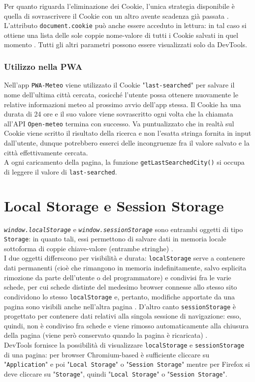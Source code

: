\documentclass[a4paper, 12pt, twoside, openright]{book}
\begin{document}
Per quanto riguarda l'eliminazione dei Cookie, l'unica strategia disponibile è quella di sovrascrivere il Cookie con un altro avente scadenza già passata \cite{W3Schools:cookies}.\\
L'attributo \texttt{document.cookie} può anche essere acceduto in lettura: in tal caso si ottiene una lista delle sole coppie nome-valore di tutti i Cookie salvati in quel momento \cite{MDN_Web_docs:cookies}. Tutti gli altri parametri possono essere visualizzati solo da DevTools.
\subsubsection{Utilizzo nella PWA}
Nell'app \texttt{PWA-Meteo} viene utilizzato il Cookie "\texttt{last-searched}" per salvare il nome dell'ultima città cercata, cosicché l'utente possa ottenere nuovamente le relative informazioni meteo al prossimo avvio dell'app stessa. Il Cookie ha una durata di 24 ore e il suo valore viene sovrascritto ogni volta che la chiamata all'API \texttt{Open-meteo} termina con successo. Va puntualizzato che in realtà sul Cookie viene scritto il risultato della ricerca e non l'esatta stringa fornita in input dall'utente, dunque potrebbero esserci delle incongruenze fra il valore salvato e la città effettivamente cercata.\\
A ogni caricamento della pagina, la funzione \texttt{getLastSearchedCity()} si occupa di leggere il valore di \texttt{last-searched}.

\section{Local Storage e Session Storage} %
\texttt{\textit{window.localStorage}} e \texttt{\textit{window.sessionStorage}} sono entrambi oggetti di tipo \texttt{Storage}: in quanto tali, essi permettono di salvare dati in memoria locale sottoforma di coppie chiave-valore (entrambe stringhe) \cite{MDN_Web_docs:storage_API}.\\
I due oggetti differscono per visibilità e durata: \texttt{localStorage} serve a contenere dati permanenti (cioè che rimangono in memoria indefinitamente, salvo esplicita rimozione da parte dell'utente o del programmatore) e condivisi fra le varie schede, per cui schede distinte del medesimo browser connesse allo stesso sito condividono lo stesso \texttt{localStorage} e, pertanto, modifiche apportate da una pagina sono visibili anche nell'altra pagina \cite{MDN_Web_docs:localStorage}. D'altro canto \texttt{sessionStorage} è progettato per contenere dati relativi alla singola sessione di navigazione: esso, quindi, non è condiviso fra schede e viene rimosso automaticamente alla chiusura della pagina (viene però conservato quando la pagina è ricaricata) \cite{MDN_Web_docs:sessionStorage}.\\
DevTools fornisce la possibilità di visualizzare \texttt{localStorage} e \texttt{sessionStorage} di una pagina: per browser Chromium-based è sufficiente cliccare su "\texttt{Application}" e poi "\texttt{Local Storage}" o "\texttt{Session Storage}" mentre per Firefox si deve cliccare su "\texttt{Storage}", quindi "\texttt{Local Storage}" o "\texttt{Session Storage}".
\end{document}
